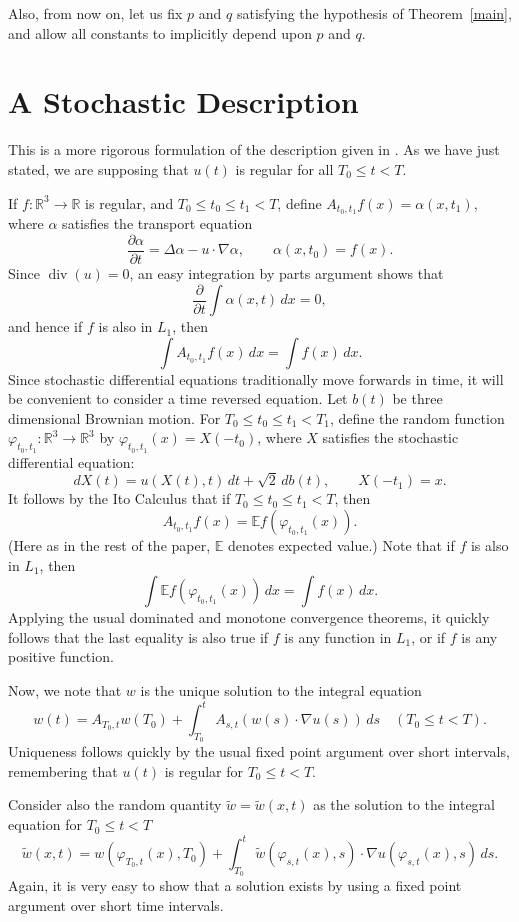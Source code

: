 \documentclass[12pt]{amsart}
\theoremstyle{remark}
\newcommand{\E}{{\mathbb E}}
\newcommand{\R}{{\mathbb R}}
\DeclareMathOperator{\divergence}{div}
\begin{document}
Also, from now on, let us fix $p$ and $q$ satisfying the hypothesis of 
Theorem~\ref{main}, and allow all constants to implicitly
depend upon $p$ and $q$.

\section{A Stochastic Description}

This is a more rigorous formulation of the description
given in \cite{montgomery-smith-pokorny}.  As we have just stated, we are
supposing that $u(t)$ is regular for all $T_0 \le t < T$.

If $f\colon\R^3 \to \R$ is regular, and
$T_0 \le t_0 \le t_1 < T$,
define $A_{t_0,t_1} f(x) = \alpha(x,t_1)$, where 
$\alpha$ satisfies the transport equation
$$ \frac{\partial\alpha}{\partial t} = \Delta \alpha - u\cdot\nabla \alpha,
   \qquad
   \alpha(x,t_0) = f(x) .$$
Since $\divergence(u) = 0$, an easy integration by parts argument shows
that
$$ \frac\partial{\partial t} \int \alpha(x,t) \, dx = 0 ,$$
and hence if $f$ is also in $L_1$, then
$$ \int A_{t_0,t_1} f(x) \, dx = \int f(x) \, dx .$$
Since stochastic
differential equations traditionally move forwards in time, it will be 
convenient to consider a time reversed equation.
Let $b(t)$ be three dimensional Brownian motion.
For $T_0 \le t_0 \le t_1 < T_1$, define the random function
$\varphi_{t_0,t_1}\colon\R^3\to\R^3$ by
$\varphi_{t_0,t_1}(x) = X(-t_0)$, where $X$ satisfies the 
stochastic differential equation:
$$ dX(t) = u(X(t),t) \, dt + \sqrt2 \, db(t),
   \qquad
   X(-t_1) = x .$$
It follows by the Ito Calculus \cite{karatzas-shreve} that
if $T_0 \le t_0 \le t_1 < T$, then
$$ A_{t_0,t_1} f(x) = \E f(\varphi_{t_0,t_1}(x)) .$$
(Here as in the rest of the paper, $\E$ denotes expected value.)
Note that if $f$ is also in $L_1$, then
$$ \int \E f(\varphi_{t_0,t_1}(x)) \, dx = \int f(x) \, dx .$$
Applying the usual dominated and monotone convergence theorems, it
quickly follows that the last equality is also true if $f$ is any
function in $L_1$, or if $f$
is any positive function.

Now, we note that $w$ is the unique solution to the integral
equation
$$ w(t) = A_{T_0,t} w(T_0) + 
   \int_{T_0}^t A_{s,t} (w(s) \cdot \nabla u(s)) \, ds 
   \quad (T_0 \le t < T).$$
Uniqueness follows quickly by the usual fixed point argument
over short intervals, 
remembering that $u(t)$ is regular for $T_0 \le t < T$.

Consider also the random quantity
$\tilde w = \tilde w(x,t)$ as the solution to the integral equation
for $T_0 \le t < T$
$$ \tilde w(x,t) = w(\varphi_{T_0,t}(x),T_0) +
   \int_{T_0}^t \tilde 
   w(\varphi_{s,t}(x),s) \cdot \nabla u(\varphi_{s,t}(x),s) \, ds .$$
Again, 
it is very easy to show that a solution exists by using a fixed point
argument over short time intervals.
\end{document}
